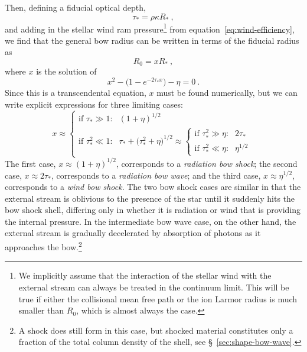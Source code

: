 \message{ !name(dusty-bow-wave.tex)}\documentclass[useAMS, usenatbib, a4paper]{mnras}
\begin{document}
Then, defining a fiducial optical depth,
\begin{equation}
  \label{eq:tau-star}
  \tau_* = \rho \kappa R_* \ ,
\end{equation}
and adding in the stellar wind ram pressure\footnote{%
  We implicitly assume that the interaction of the stellar wind with
  the external stream can always be treated in the continuum limit.
  This will be true if either the collisional mean free path or the
  ion Larmor radius is much smaller than \(R_0\), which is almost
  always the case.} %
from equation~\eqref{eq:wind-efficiency}, we find that the general bow
radius can be written in terms of the fiducial radius as
\begin{equation}
  \label{eq:R0-definition}
  R_0 = x R_* \ ,
\end{equation}
where \(x\) is the solution of
\begin{equation}
  \label{eq:rad-full-x}
  x^2 - \bigl(1 - e^{-2 \tau_* x} \bigr) - \eta = 0 \ .
\end{equation}
Since this is a transcendental equation, \(x\) must be found
numerically, but we can write explicit expressions for three limiting
cases:
\begin{equation}
  \label{eq:x-cases}
  x \approx
  \begin{cases}
    \text{if \(\tau_* \gg 1\):} & (1 + \eta)^{1/2}  \\
    \text{if \(\tau_*^2 \ll 1\):} & \tau_* + \bigl( \tau_*^2 + \eta \bigr)^{1/2} \approx
    \begin{cases}
      \text{if \(\tau_*^2 \gg \eta\):} & 2 \tau_*  \\
      \text{if \(\tau_*^2 \ll \eta\):} & \eta^{1/2} 
    \end{cases}
  \end{cases}
\end{equation}
The first case, \(x \approx (1 + \eta)^{1/2}\), corresponds to a
\textit{radiation bow shock}; the second case,
\(x \approx 2 \tau_* \), corresponds to a \textit{radiation bow wave}; and the
third case, \(x \approx \eta^{1/2}\), corresponds to a \textit{wind bow shock}.
The two bow shock cases are similar in that the external stream is
oblivious to the presence of the star until it suddenly hits the bow
shock shell, differing only in whether it is radiation or wind that is
providing the internal pressure.  In the intermediate bow wave case,
on the other hand, the external stream is gradually decelerated by
absorption of photons as it approaches the bow.\footnote{A shock does
  still form in this case, but shocked material constitutes only a
  fraction of the total column density of the shell, see
  \S~\ref{sec:shape-bow-wave}.}
\end{document}

